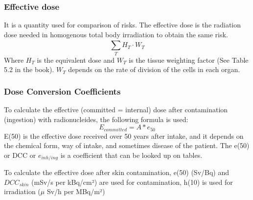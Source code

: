 \subsubsection{Effective dose}
It is a quantity used for comparison of risks. The effective dose is the radiation dose needed in homogenous total body irradiation to obtain the same risk.
\[ \sum_{T}^{}H_T\cdot W_T \]
Where $H_T$ is the equivalent dose and $W_T$ is the tissue weighting factor (See Table 5.2 in the book). $W_T$ depends on the rate of division of the cells in each organ.

\subsubsection{Dose Conversion Coefficients}
To calculate the effective (committed = internal) dose after contamination (ingestion) with radionucleides, the following formula is used:
\[ E_{committed} = A*e_{50}\]
E(50) is the effective dose received over 50 years after intake, and it depends on the chemical form, way of intake, and sometimes disease of the patient. The e(50) or DCC or $e_{inh/ing}$ is a coefficient that can be looked up on tables.

To calculate the effective dose after skin contamination, e(50) (Sv/Bq) and $DCC_{skin}$ (mSv/s per kBq/cm²) are used for contamination, h(10) is used for irradiation ($\mu$ Sv/h per MBq/m²)
